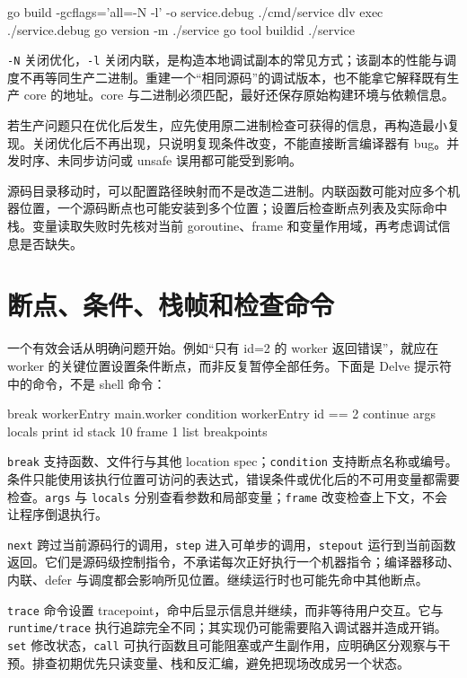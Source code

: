 \documentclass[UTF8,fontset=fandol,openany,11pt]{ctexbook}
\begin{document}
\begin{codeblock}
go build -gcflags='all=-N -l' -o service.debug ./cmd/service
dlv exec ./service.debug
go version -m ./service
go tool buildid ./service
\end{codeblock}

\texttt{-\allowbreak{}N} 关闭优化，\texttt{-\allowbreak{}l} 关闭内联，是构造本地调试副本的常见方式；该副本的性能与调度不再等同生产二进制。重建一个“相同源码”的调试版本，也不能拿它解释既有生产 core 的地址。core 与二进制必须匹配，最好还保存原始构建环境与依赖信息。\cite{tools-delve-exec}

若生产问题只在优化后发生，应先使用原二进制检查可获得的信息，再构造最小复现。关闭优化后不再出现，只说明复现条件改变，不能直接断言编译器有 bug。并发时序、未同步访问或 unsafe 误用都可能受到影响。

源码目录移动时，可以配置路径映射而不是改造二进制。内联函数可能对应多个机器位置，一个源码断点也可能安装到多个位置；设置后检查断点列表及实际命中栈。变量读取失败时先核对当前 goroutine、frame 和变量作用域，再考虑调试信息是否缺失。

\section{断点、条件、栈帧和检查命令}
一个有效会话从明确问题开始。例如“只有 id=2 的 worker 返回错误”，就应在 worker 的关键位置设置条件断点，而非反复暂停全部任务。下面是 Delve 提示符中的命令，不是 shell 命令：

\begin{codeblock}
break workerEntry main.worker
condition workerEntry id == 2
continue
args
locals
print id
stack 10
frame 1
list
breakpoints
\end{codeblock}

\texttt{break} 支持函数、文件行与其他 location spec；\texttt{condition} 支持断点名称或编号。条件只能使用该执行位置可访问的表达式，错误条件或优化后的不可用变量都需要检查。\texttt{args} 与 \texttt{locals} 分别查看参数和局部变量；\texttt{frame} 改变检查上下文，不会让程序倒退执行。\cite{tools-delve-cli}

\texttt{next} 跨过当前源码行的调用，\texttt{step} 进入可单步的调用，\texttt{stepout} 运行到当前函数返回。它们是源码级控制指令，不承诺每次正好执行一个机器指令；编译器移动、内联、defer 与调度都会影响所见位置。继续运行时也可能先命中其他断点。

\texttt{trace} 命令设置 tracepoint，命中后显示信息并继续，而非等待用户交互。它与 \texttt{runtime/\allowbreak{}trace} 执行追踪完全不同；其实现仍可能需要陷入调试器并造成开销。\texttt{set} 修改状态，\texttt{call} 可执行函数且可能阻塞或产生副作用，应明确区分观察与干预。排查初期优先只读变量、栈和反汇编，避免把现场改成另一个状态。
\end{document}
